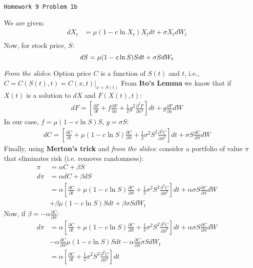 \documentclass[12pt]{article}
\begin{document}
	\begin{center}
        \Large{\texttt{Homework 9 Problem 1b}} \vspace*{0.8mm}  
	\end{center}
    We are given:
    \begin{align*}
      dX_t &= \mu(1 - c\ln X_t) X_t dt + \sigma X_t dW_t\\[10pt]
    \end{align*}
    Now, for stock price, $S$:
    \begin{equation}
        \label{eqn:givenSP}
      dS = \mu(1 - c\ln S) S dt + \sigma S dW_t\\[10pt]
    \end{equation}

    \textit{From the slides}: Option price $C$ is a function of $S(t)$ and $t$, i.e., $C = C(S(t), t) = C(x,t) \bigg|_{x=S(t)}$ 
    From \textbf{Ito's Lemma} we know that if $X(t)$ is a solution to $dX$ and $F(X(t), t)$:
    \begin{align*}
      dF = \left[ \frac{\partial F}{\partial t} + f \frac{\partial F}{\partial x} + \frac{1}{2} g^2 \frac{\partial^2 F}{\partial x^2} \right]dt + g \frac{\partial F}{\partial x} dW
    \end{align*}
    In our case, $f = \mu (1 - c \ln S) S$, $g= \sigma S $:
    \begin{align*}
      dC = \left[ \frac{\partial C}{\partial t} + \mu (1 - c \ln S) \frac{\partial C}{\partial S} + \frac{1}{2} \sigma^2 S^2 \frac{\partial^2 C}{\partial S^2} \right] dt + \sigma S \frac{\partial C}{\partial S} dW
    \end{align*}
    Finally, using \textbf{Merton's trick} and \textit{from the slides}: consider a portfolio of value $\pi$ that eliminates risk (i.e. removes randomness):
    \begin{align*}
      \pi  &= \alpha C + \beta S \\[10pt]
      d\pi &= \alpha dC + \beta dS \\[10pt]
           &= \alpha \left[ \frac{\partial C}{\partial t} + \mu (1 - c \ln S) \frac{\partial C}{\partial S} + \frac{1}{2} \sigma^2 S^2 \frac{\partial^2 C}{\partial S^2} \right] dt + \alpha \sigma S \frac{\partial C}{\partial S} dW \\[10pt]
           &+ \beta \mu(1 - c\ln S) S dt + \beta \sigma S dW_t 
    \end{align*}
    Now, if $\beta = - \alpha \frac{\partial C}{\partial S}$:
    \begin{align*}
        d \pi &= \alpha \left[ \frac{\partial C}{\partial t} + \mu (1 - c \ln S) \frac{\partial C}{\partial S} + \frac{1}{2} \sigma^2 S^2 \frac{\partial^2 C}{\partial S^2} \right] dt + \alpha \sigma S \frac{\partial C}{\partial S} dW \\[10pt] &- \alpha \frac{\partial C}{\partial S} \mu(1 - c\ln S) S dt  - \alpha \frac{\partial C}{\partial S} \sigma S dW_t \\[10pt]
            &= \alpha \left[ \frac{\partial C}{\partial t} + \frac{1}{2} \sigma^2 S^2 \frac{\partial^2 C}{\partial S^2} \right] dt \\[10pt]
    \end{align*}
\end{document}
